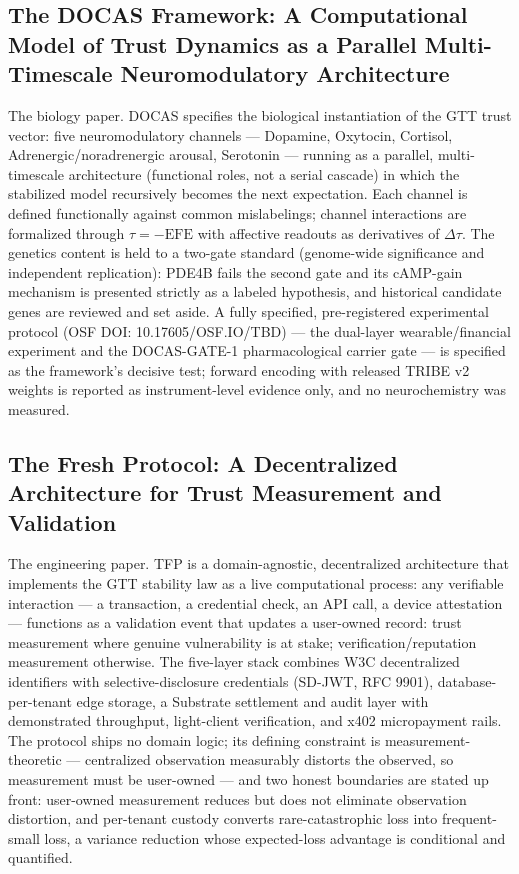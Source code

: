 \documentclass[11pt]{article}
\begin{document}
\subsection*{The DOCAS Framework: A Computational Model of Trust Dynamics as a Parallel Multi-Timescale Neuromodulatory Architecture}

The biology paper. DOCAS specifies the biological instantiation of the GTT trust
vector: five neuromodulatory channels --- Dopamine, Oxytocin, Cortisol,
Adrenergic/noradrenergic arousal, Serotonin --- running as a parallel,
multi-timescale architecture (functional roles, not a serial cascade) in which
the stabilized model recursively becomes the next expectation. Each channel is
defined functionally against common mislabelings; channel interactions are
formalized through $\tau = -\mathrm{EFE}$ with affective readouts as derivatives
of $\Delta\tau$. The genetics content is held to a two-gate standard
(genome-wide significance and independent replication): PDE4B fails the second
gate and its cAMP-gain mechanism is presented strictly as a labeled hypothesis,
and historical candidate genes are reviewed and set aside. A fully specified, pre-registered experimental protocol (OSF DOI: 10.17605/OSF.IO/TBD) --- the dual-layer wearable/financial experiment and the DOCAS-GATE-1 pharmacological carrier gate --- is specified as the framework's decisive test; forward encoding with released TRIBE v2 weights is reported as instrument-level evidence only, and no neurochemistry was measured.

\subsection*{The Fresh Protocol: A Decentralized Architecture for Trust Measurement and Validation}

The engineering paper. TFP is a domain-agnostic, decentralized architecture that
implements the GTT stability law as a live computational process: any verifiable
interaction --- a transaction, a credential check, an API call, a device
attestation --- functions as a validation event that updates a user-owned
record: trust measurement where genuine vulnerability is at stake;
verification/reputation measurement otherwise. The five-layer stack combines W3C decentralized identifiers with
selective-disclosure credentials (SD-JWT, RFC 9901), database-per-tenant edge
storage, a Substrate settlement and audit layer with demonstrated throughput,
light-client verification, and x402 micropayment rails. The protocol ships no
domain logic; its defining constraint is measurement-theoretic --- centralized
observation measurably distorts the observed, so measurement must be user-owned
--- and two honest boundaries are stated up front: user-owned measurement
reduces but does not eliminate observation distortion, and per-tenant custody
converts rare-catastrophic loss into frequent-small loss, a variance reduction
whose expected-loss advantage is conditional and quantified.
\end{document}
